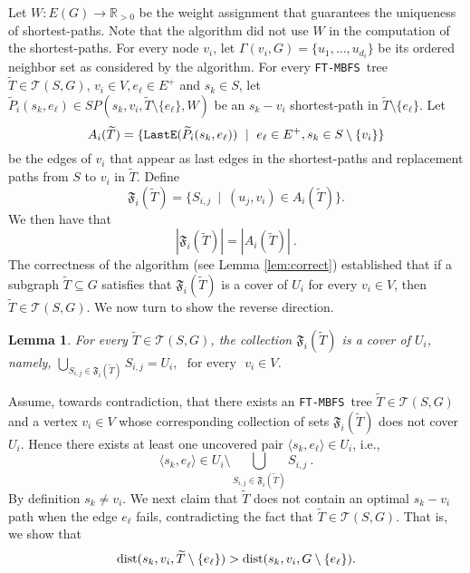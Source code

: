 \documentclass[12pt]{article}
\newtheorem{lemma}[theorem]{Lemma}
\def\Set{\mathfrak{F}}
\newcommand{\dist}{\mbox{\rm dist}}
\def\Proof{\par\noindent{\bf Proof:~}}
\def\LastE{\mbox{\tt LastE}}
\def\FTMBFS{\mbox{\tt FT-MBFS}}
\begin{document}
Let $W:E(G) \to \mathbb{R}_{>0}$ be the weight assignment that guarantees the uniqueness of shortest-paths. Note that the algorithm did not use $W$ in the computation of the shortest-paths. For every node $v_i$, let
$\Gamma(v_i,G)=\{u_{1}, \ldots, u_{d_i}\}$ be its ordered neighbor set
as considered by the algorithm.
For every \FTMBFS\ tree
$\widetilde{T}\in \mathcal{T}(S,G)$, $v_i \in V, e_\ell \in E^{+}$ and $s_k \in S$, let $\widetilde{P}_i(s_k,e_\ell) \in SP(s_k, v_i, \widetilde{T} \setminus \{e_\ell\},W)$ be an $s_k-v_i$ shortest-path in $\widetilde{T} \setminus \{e_\ell\}$. Let
$$A_i(\widetilde{T})=\{\LastE(\widetilde{P}_i(s_k,e_\ell)) ~\mid~ e_\ell \in E^{+}, s_k \in S \setminus \{v_i\} \}$$
be the edges of $v_i$ that appear as last edges in the shortest-paths and replacement paths from $S$ to $v_i$ in $\widetilde{T}$.
Define
$$\Set_i(\widetilde{T})=\{S_{i,j} ~\mid~ (u_j, v_i) \in A_i(\widetilde{T})\}.$$
We then have that
\begin{equation}
\label{eq:set_size}
|\Set_i(\widetilde{T})|=|A_i(\widetilde{T})|~.
\end{equation}
The correctness of the algorithm (see Lemma \ref{lem:correct})
established that if a subgraph $\widetilde{T} \subseteq G$ satisfies that
$\Set_i(\widetilde{T})$ is a cover of
$U_i$ for every $v_i \in V$, then $\widetilde{T} \in \mathcal{T}(S,G)$.
We now turn to show the reverse direction.
\begin{lemma}
\label{lem:cover_tree}
For every $\widetilde{T} \in \mathcal{T}(S,G)$, the collection $\Set_i(\widetilde{T})$ is a cover of $U_i$, namely,
$\bigcup_{S_{i,j} \in \Set_i(\widetilde{T})}S_{i,j}=U_i, \mbox{~~for every~~} v_i \in V$.
\end{lemma}
\Proof
Assume, towards contradiction, that there exists an \FTMBFS\ tree
$\widetilde{T} \in \mathcal{T}(S,G)$ and a vertex $v_i \in V$
whose corresponding collection of sets $\Set_i(\widetilde{T})$
does not cover $U_i$.
Hence there exists at least one uncovered pair $\langle s_k, e_\ell \rangle \in U_i$, i.e.,
\begin{equation}
\label{eq:notcovered}
\langle s_k, e_\ell \rangle \in U_i \setminus\bigcup_{S_{i,j} \in \Set_i(\widetilde{T})}S_{i,j}~.
\end{equation}
By definition $s_k \neq v_i$. We next claim that $\widetilde{T}$ does not contain an optimal
$s_k-v_i$ path when the edge $e_\ell$ fails,
contradicting the fact that $\widetilde{T} \in \mathcal{T}(S,G)$.
That is, we show that
$$\dist(s_k, v_i, \widetilde{T} \setminus \{e_\ell\})>\dist(s_k, v_i, G \setminus \{e_\ell\}).$$
\end{document}
